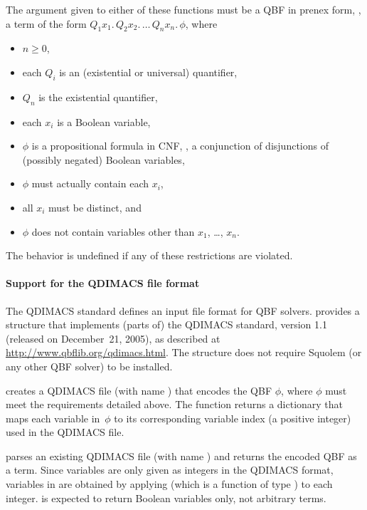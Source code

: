 The argument given to either of these functions must be a QBF in
prenex form, \ie, a term of the form $Q_1 x_1. \, Q_2 x_2. \, \ldots
\, Q_n x_n. \, \phi$, where
\begin{itemize}
\item $n \geq 0$,
\item each $Q_i$ is an (existential or universal) quantifier,
\item $Q_n$ is the existential quantifier,
\item each $x_i$ is a Boolean variable,
\item $\phi$ is a propositional formula in CNF, \ie, a conjunction of
  disjunctions of (possibly negated) Boolean variables,
\item $\phi$ must actually contain each $x_i$,
\item all $x_i$ must be distinct, and
\item $\phi$ does not contain variables other than $x_1$, \dots,
  $x_n$.
\end{itemize}
The behavior is undefined if any of these restrictions are violated.

\paragraph{Support for the QDIMACS file format}

The QDIMACS standard defines an input file format for QBF solvers.
 provides a structure  that implements
(parts of) the QDIMACS standard, version 1.1 (released on December~21,
2005), as described at \url{http://www.qbflib.org/qdimacs.html}.  The
 structure does not require Squolem (or any other QBF
solver) to be installed.

 creates a QDIMACS file
(with name ) that encodes the QBF $\phi$, where $\phi$ must
meet the requirements detailed above.  The function returns a
dictionary that maps each variable in~$\phi$ to its corresponding
variable index (a positive integer) used in the QDIMACS file.

 parses an existing QDIMACS
file (with name ) and returns the encoded QBF as a \HOL{}
term.  Since variables are only given as integers in the QDIMACS
format, variables in \HOL{} are obtained by applying  (which is
a function of type ) to each integer.   is
expected to return Boolean variables only, not arbitrary \HOL{} terms.

